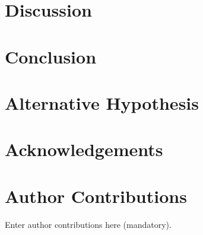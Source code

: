 \documentclass[10pt,a4paper,twocolumn]{article}
\begin{document}
\section{Discussion}


\section{Conclusion}


\section{Alternative Hypothesis}

\section*{Acknowledgements}

%



\appendix
\section{Author Contributions}
Enter author contributions here (mandatory).
\end{document}
